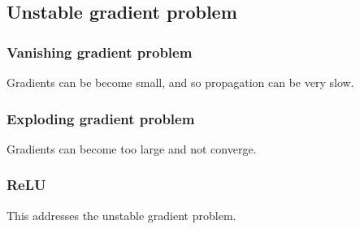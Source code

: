 
\subsection{Unstable gradient problem}

\subsubsection{Vanishing gradient problem}

Gradients can be become small, and so propagation can be very slow.

\subsubsection{Exploding gradient problem}

Gradients can become too large and not converge.

\subsubsection{ReLU}

This addresses the unstable gradient problem.
